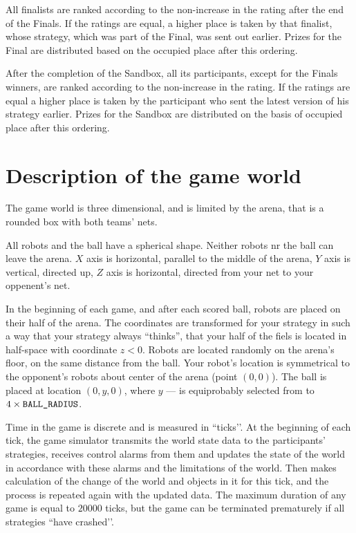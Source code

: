 All finalists are ranked according to the non-increase in the rating after the end of the Finals. If the ratings are equal, a higher place is taken by that finalist, whose strategy, which was part of the Final, was sent out earlier. Prizes for the Final are distributed based on the occupied place after this
ordering.

After the completion of the Sandbox, all its participants, except for the Finals winners, are ranked according to the non-increase in the rating. If the ratings are equal 
a higher place is taken by the participant who sent the latest version of his strategy earlier. Prizes for the Sandbox are distributed on the basis of
occupied place after this ordering.

\section{Description of the game world}

The game world is three dimensional, and is limited by the arena, that is a rounded box with both teams' nets.

All robots and the ball have a spherical shape. Neither robots nr the ball can leave the arena.
$X$ axis is horizontal, parallel to the middle of the arena,
$Y$ axis is vertical, directed up,
$Z$ axis is horizontal, directed from your net to your oppenent's net.

In the beginning of each game, and after each scored ball, robots are placed on their half of the arena.
The coordinates are transformed for your strategy in such a way that your strategy always ``thinks'',
that your half of the fiels is located in half-space with coordinate $z < 0$.
Robots are located randomly on the arena's floor, on the same distance from the ball.
Your robot's location is symmetrical to the opponent's robots about center of the arena (point $(0, 0)$).
The ball is placed at location $(0, y, 0)$, where $y$ ---
is equiprobably selected from  to $4\times\texttt{BALL\_RADIUS}$.

Time in the game is discrete and is measured in ``ticks’’. At the beginning of each tick, the game simulator transmits the world state data to the participants' strategies,
receives control alarms from them and updates the state of the world in accordance with these alarms and the limitations of the world. Then makes
calculation of the change of the world and objects in it for this tick, and the process is repeated again with the updated data. The maximum duration of any game
is equal to $20000$ ticks, but the game can be terminated prematurely if all strategies
``have crashed’’.

